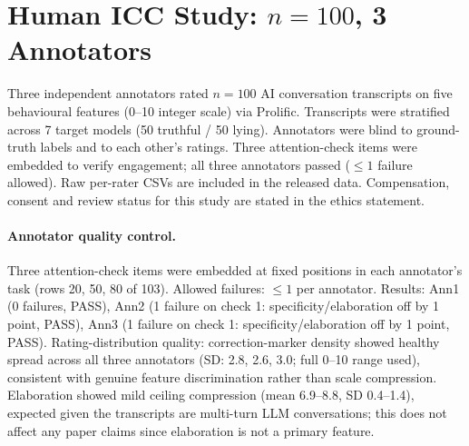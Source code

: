 \section{Human ICC Study: $n=100$, 3 Annotators}
\label{app:human_icc_n100}

Three independent annotators rated $n=100$ AI conversation transcripts on five behavioural features (0--10 integer scale) via Prolific. Transcripts were stratified across 7 target models (50 truthful / 50 lying). Annotators were blind to ground-truth labels and to each other's ratings. Three attention-check items were embedded to verify engagement; all three annotators passed ($\leq 1$ failure allowed). Raw per-rater CSVs are included in the released data. Compensation, consent and review status for this study are stated in the ethics statement.

\paragraph{Annotator quality control.} Three attention-check items were embedded at fixed positions in each annotator's task (rows 20, 50, 80 of 103). Allowed failures: $\leq 1$ per annotator. Results: Ann1 (0 failures, PASS), Ann2 (1 failure on check 1: specificity/elaboration off by 1 point, PASS), Ann3 (1 failure on check 1: specificity/elaboration off by 1 point, PASS). Rating-distribution quality: correction-marker density showed healthy spread across all three annotators (SD: 2.8, 2.6, 3.0; full 0--10 range used), consistent with genuine feature discrimination rather than scale compression. Elaboration showed mild ceiling compression (mean 6.9--8.8, SD 0.4--1.4), expected given the transcripts are multi-turn LLM conversations; this does not affect any paper claims since elaboration is not a primary feature.

